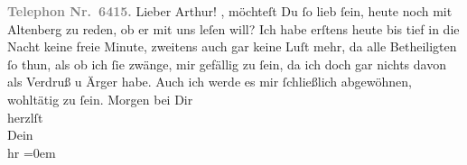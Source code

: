 \begin{ledgroupsized}[t]{13cm}
           \pstart
           \textcolor{gray}{\textbf{Telephon Nr. 6415.}}\pend
           \pstart\center{}Lieber Arthur!\pend\pstart
           \label{K_L00659_1v}\label{K_L00659_1h},
               möchteſt Du ſo lieb ſein, heute noch mit Altenberg
               zu reden, ob er mit uns leſen will? Ich habe erſtens heute bis tief in die Nacht
               keine freie Minute, {\pb}zweitens auch gar keine Luſt
               mehr, da alle Betheiligten ſo thun, als ob ich ſie zwänge, mir gefällig zu ſein, da
               ich doch gar nichts davon als Verdruß u Ärger habe. Auch ich werde es mir ſchließlich
               abgewöhnen, wohltätig zu ſein.\pend
           \pstart
           Morgen bei Dir{\\[\baselineskip]}herzlſt{\\[\baselineskip]}Dein{\\[\baselineskip]}\spacefill\mbox{hr}\pend
           \leftskip=0em{}\pstart
           \textcolor{gray}{\textbf{\label{T_L00659_1v}\label{T_L00659_1h}}}\pend
           
         
         \endnumbering{}\end{ledgroupsized}  \newcommand{\dateiname}{L00659}\newcommand{\titel}{Hermann Bahr an Arthur Schnitzler, 23. 3. 1897}\newcommand{\editorInnen}{ Kurt Ifkovits,  Martin Anton Müller}
      